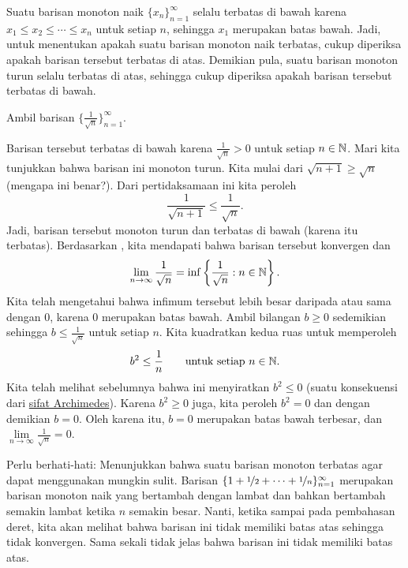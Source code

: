 Suatu barisan monoton naik $\{ x_n \}_{n=1}^\infty$
selalu terbatas di bawah karena $x_1 \leq x_2 \leq \cdots \leq x_n$
untuk setiap $n$, sehingga $x_1$ merupakan batas bawah.  Jadi, untuk menentukan apakah suatu 
barisan monoton naik terbatas, cukup diperiksa apakah barisan tersebut
terbatas di atas.  Demikian pula, suatu barisan monoton turun
selalu terbatas di atas, sehingga cukup diperiksa apakah barisan tersebut
terbatas di bawah.

\begin{example}
Ambil barisan $\bigl\{ \frac{1}{\sqrt{n}} \bigr\}_{n=1}^\infty$.

Barisan tersebut
terbatas di bawah karena
$\frac{1}{\sqrt{n}} > 0$ untuk setiap $n \in {\mathbb{N}}$.
Mari kita tunjukkan bahwa barisan ini monoton turun.  Kita mulai dari
$\sqrt{n+1} \geq \sqrt{n}$ (mengapa ini benar?).  Dari pertidaksamaan ini
kita peroleh
\begin{equation*}
\frac{1}{\sqrt{n+1}} \leq \frac{1}{\sqrt{n}} .
\end{equation*}
Jadi, barisan tersebut monoton turun dan terbatas di bawah (karena itu
terbatas).  Berdasarkan , kita mendapati bahwa barisan tersebut
konvergen dan
\begin{equation*}
\lim_{n\to \infty} \frac{1}{\sqrt{n}}
=
\inf \left\{ \frac{1}{\sqrt{n}} : n \in {\mathbb{N}} \right\} .
\end{equation*}
Kita telah mengetahui bahwa infimum tersebut lebih besar daripada atau sama dengan 0, karena
0 merupakan batas bawah.  Ambil bilangan $b \geq 0$ sedemikian
sehingga $b \leq \frac{1}{\sqrt{n}}$ untuk setiap $n$.  Kita kuadratkan kedua ruas untuk
memperoleh
\begin{equation*}
b^2 \leq \frac{1}{n} \qquad \text{untuk setiap } n \in {\mathbb{N}}.
\end{equation*}
Kita telah melihat sebelumnya bahwa ini menyiratkan $b^2 \leq 0$ (suatu konsekuensi
dari \hyperref[thm:arch:i]{sifat Archimedes}).  Karena $b^2 \geq 0$
juga, kita peroleh $b^2 = 0$
dan dengan demikian $b = 0$.
Oleh karena itu, $b=0$ merupakan batas bawah terbesar, dan $\lim\limits_{n\to\infty} \frac{1}{\sqrt{n}} = 0$.
\end{example}

\begin{example}
Perlu berhati-hati:  Menunjukkan bahwa suatu barisan monoton terbatas
agar dapat menggunakan  mungkin sulit.
Barisan
$\{ 1 + \nicefrac{1}{2} + \cdots + \nicefrac{1}{n} \}_{n=1}^\infty$
merupakan barisan monoton naik
yang bertambah dengan lambat dan bahkan bertambah semakin lambat ketika $n$ semakin
besar.  Nanti, ketika sampai pada pembahasan deret, kita akan melihat
bahwa barisan ini tidak memiliki batas atas sehingga tidak konvergen.  Sama sekali tidak
jelas bahwa barisan ini tidak memiliki batas atas.
\end{example}

